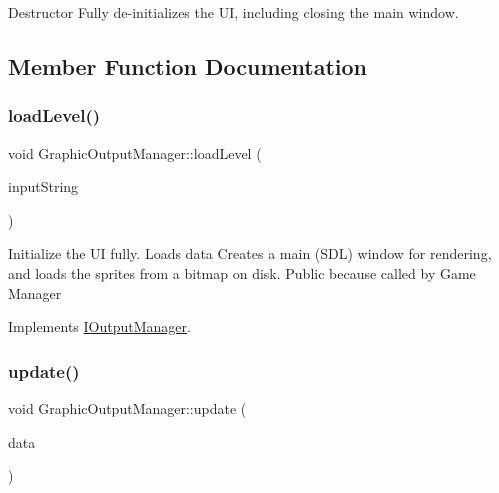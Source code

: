 Destructor Fully de-\/initializes the UI, including closing the main window. 

\subsection{Member Function Documentation}
\mbox{\label{class_graphic_output_manager_af2d827a7b2ae16889e66e67c18c731d1}} 
\subsubsection{\texorpdfstring{load\+Level()}{loadLevel()}}
{\footnotesize\ttfamily void Graphic\+Output\+Manager\+::load\+Level (\begin{DoxyParamCaption}\item[{\mbox{\hyperlink{class_output_data}{Output\+Data}}}]{input\+String }\end{DoxyParamCaption})\hspace{0.3cm}{\ttfamily [virtual]}}

Initialize the UI fully. Loads data Creates a main (S\+DL) window for rendering, and loads the sprites from a bitmap on disk. Public because called by Game Manager 

Implements \mbox{\hyperlink{class_i_output_manager_a50a935d76cf10427b0977406a2338146}{I\+Output\+Manager}}.

\mbox{\label{class_graphic_output_manager_aed60e3ba3328c6ca2ab0b3bf60e9871f}} 
\subsubsection{\texorpdfstring{update()}{update()}\hspace{0.1cm}{\footnotesize\ttfamily [1/2]}}
{\footnotesize\ttfamily void Graphic\+Output\+Manager\+::update (\begin{DoxyParamCaption}\item[{std\+::vector$<$ std\+::shared\+\_\+ptr$<$ Data\+Update $>$$>$}]{data }\end{DoxyParamCaption})}

